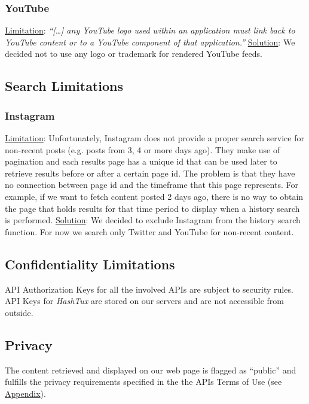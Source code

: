\subsubsection{YouTube}
\underline{Limitation}: \textit{``[\dots] any YouTube logo used within an
application must link back to YouTube content or to a YouTube component of
that application.''} \newline
\underline{Solution}: We decided not to use any logo or trademark for rendered
YouTube feeds.

\subsection{Search Limitations}
\subsubsection{Instagram}
\underline{Limitation}: Unfortunately, Instagram does not provide a proper
search service for non-recent posts (e.g. posts from 3, 4 or more days ago).
They make use of pagination and each results page has a unique id that can be
used later to retrieve results before or after a certain page id. The problem is
that they have no connection between page id and the timeframe that this page
represents. For example, if we want to fetch content posted 2 days ago, there is
no way to obtain the page that holds results for that time period to display
when a history search is performed. \newline
\underline{Solution}: We decided to exclude Instagram from the history search
function. For now we search only Twitter and YouTube for non-recent content.

\subsection{Confidentiality Limitations}
API Authorization Keys for all the involved APIs are subject to security rules.
API Keys for \textit{HashTux} are stored on our servers and are not accessible
from outside.

\subsection{Privacy}
The content retrieved and displayed on our web page is flagged as “public” and
fulfills the privacy requirements specified in the the APIs Terms of Use
(see \hyperlink{refapis}{Appendix}).